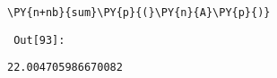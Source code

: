 {\par%
\vspace{-1\baselineskip}%
}%
\begin{notebookcell}[93]%
\begin{addmargin}[\cellleftmargin]{0em}%
{\smaller%
\par%
%
\vspace{-1\smallerfontscale}%
\begin{Verbatim}[commandchars=\\\{\}]
\PY{n+nb}{sum}\PY{p}{(}\PY{n}{A}\PY{p}{)}
\end{Verbatim}
%
\par%
\vspace{-1\smallerfontscale}}%
\end{addmargin}
\end{notebookcell}

\par\vspace{1\smallerfontscale}%
    
        {\par%
        \vspace{-1\smallerfontscale}%
        \noindent%
        \begin{minipage}{\cellleftmargin}%
    \hfill%
    {\smaller%
    \tt%
    \color{nbframe-out-prompt}%
    Out[93]:}%
    \hspace{\inputpadding}%
    \hspace{0em}%
    \hspace{3pt}%
    \end{minipage}%
        }%
    \begin{addmargin}[\cellleftmargin]{0em}%
    {\smaller%
    \vspace{-1\smallerfontscale}%
    
    
    
    \begin{verbatim}
22.004705986670082
    \end{verbatim}

    
}%
    \end{addmargin}%

